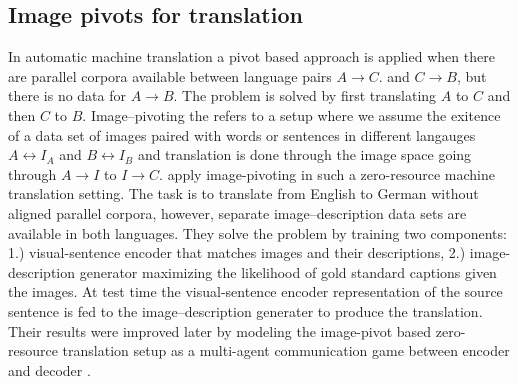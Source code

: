 \subsection{Image pivots for translation}
\label{sec:imgpivot}

In automatic machine translation a pivot based approach is applied
when there are parallel corpora available between language pairs $A\rightarrow C$.
and $C \rightarrow B$, but there is no data for $A\rightarrow B$. The problem is
solved by first translating $A$ to $C$ and then $C$ to $B$. 
Image--pivoting the refers to a setup where we assume the exitence of a data set
of images paired with words or sentences in different langauges $A \leftrightarrow I_A$ and 
$B \leftrightarrow I_B$ and translation is done through the image space 
going  through $A \rightarrow I$ to $I \rightarrow C$. 
\cite{nakayama2017zero} apply image-pivoting in such a zero-resource machine
translation setting. The task is to translate from English to German without
aligned parallel corpora, however, separate image--description data sets are
available in both languages. They solve the problem by
training two components: 1.) visual-sentence encoder that matches images and their descriptions,
2.) image-description generator maximizing the likelihood of gold standard captions given the images.
At test time the visual-sentence encoder representation of the source sentence is fed to the
image--description generater to produce the translation.
Their results were improved later by modeling
the image-pivot based zero-resource translation setup as a
multi-agent communication game between encoder and decoder
\citep{chen2018zero,lee2017emergent}.






